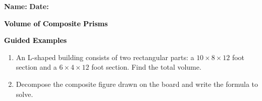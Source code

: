\documentclass[12pt, letterpaper, fleqn]{article}
\begin{document}
\textbf{Name:} \underline{\hspace{5cm}}
\hfill
\textbf{Date:} \underline{\hspace{3cm}}\\

\begin{tcolorbox}[colback=customteal!20]
    \large\textcolor{black}{\textbf{Volume of Composite Prisms}}
\end{tcolorbox}
\newpage
\begin{tcolorbox}[colback=customteal!20]
    \large\textcolor{black}{\textbf{Guided Examples}}
\end{tcolorbox}
\begin{enumerate}[itemsep=3.5cm, leftmargin=0.6cm]
\item An L-shaped building consists of two rectangular parts: a $10 \times 8 \times 12$ foot section and a $6 \times 4 \times 12$ foot section. Find the total volume.
\vspace{3cm}
\item Decompose the composite figure drawn on the board and write the formula to solve.
\end{enumerate}
\end{document}
